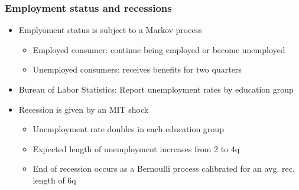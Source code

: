 \documentclass[pdflatex,aspectratio=169, handout]{beamer}
\begin{document}
\begin{frame}
	\frametitle{ Employment status and recessions}
	\begin{itemize}
		\itemsep = \bigskipamount 
		\item Emplyoment status is subject to a Markov process
		\begin{itemize}
			\itemsep = .5\bigskipamount
			\item Employed consumer: continue being employed or become unemployed 
			\item Unemployed consumers: receives benefits for two quarters
		\end{itemize}
		
		\item Bureau of Labor Statistics: Report unemployment rates by education group 
		
		\item Recession is given by an MIT shock
		\begin{itemize}
			\itemsep = .5\bigskipamount
			\item Unemployment rate doubles in each education group
			\item Expected length of unemployment increases from 2 to 4q
			\item End of recession occurs as a Bernoulli process calibrated for an avg. rec. length of 6q
		\end{itemize}
	\end{itemize}
\end{frame}
\end{document}
